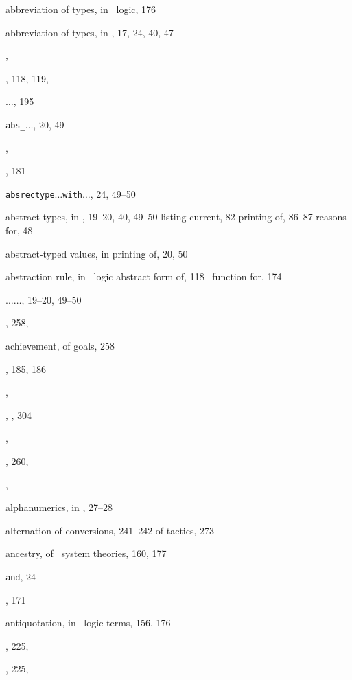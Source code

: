 \begin{theindex}
  \item abbreviation of types, in \HOL\ logic, 176
  \item abbreviation of types, in \ML, 17, 24, 40, 47
  \item {}, 
  \item {}, 118, 119, 
  \item {}$\ldots$, 195
  \item {\small\verb+abs_+$\ldots$}, 20, 49
  \item {}, 
  \item {}, 181
  \item {\small\verb+absrectype+}$\ldots${\small\verb+with+}$\ldots$, 
		24, 49--50
  \item abstract types, in \ML, 19--20, 40, 49--50
    \subitem listing current, 82
    \subitem printing of, 86--87
    \subitem reasons for, 48
  \item abstract-typed values, in \ML
    \subitem printing of, 20, 50
  \item abstraction rule, in \HOL\ logic
    \subitem abstract form of, 118
    \subitem \ML\ function for, 174
  \item {}$\ldots$$\ldots$, 19--20, 49--50
  \item {}, 258, 
  \item achievement, of goals, 258
  \item {}, 185, 186
  \item {}, 
  \item {}, , 304
  \item {}, 
  \item {}, 260, 
  \item {}, 
  \item alphanumerics, in \ML, 27--28
  \item alternation
    \subitem of conversions, 241--242
    \subitem of tactics, 273
  \item ancestry, of \HOL\ system theories, 160, 177
  \item {\small\verb+and+}, 24
  \item {}, 171
  \item antiquotation, in \HOL\ logic terms, 156, 176
  \item {}, 225, 
  \item {}, 225, 

\end{theindex}
